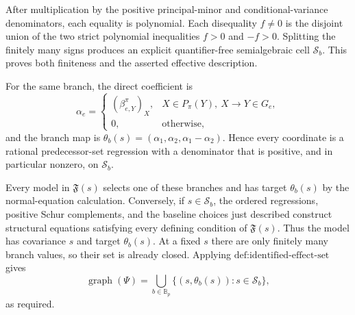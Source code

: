 After multiplication by the positive principal-minor and conditional-variance denominators, each equality is polynomial.  Each disequality \(f\ne0\) is the disjoint union of the two strict polynomial inequalities \(f>0\) and \(-f>0\).  Splitting the finitely many signs produces an explicit quantifier-free semialgebraic cell \(\mathcal S_b\).  This proves both finiteness and the asserted effective description.

For the same branch, the direct coefficient is
\[
 \alpha_e=
 \begin{cases}
  (\beta_{e,Y}^{\pi})_X,&X\in P_\pi(Y),\ X\to Y\in G_e,\\
  0,&\text{otherwise},
 \end{cases}
\]
and the branch map is \(\theta_b(s)=(\alpha_1,\alpha_2,\alpha_1-\alpha_2)\).  Hence every coordinate is a rational predecessor-set regression with a denominator that is positive, and in particular nonzero, on \(\mathcal S_b\).

Every model in \(\mathfrak F(s)\) selects one of these branches and has target \(\theta_b(s)\) by the normal-equation calculation.  Conversely, if \(s\in\mathcal S_b\), the ordered regressions, positive Schur complements, and the baseline choices just described construct structural equations satisfying every defining condition of \(\mathfrak F(s)\).  Thus the model has covariance \(s\) and target \(\theta_b(s)\).  At a fixed \(s\) there are only finitely many branch values, so their set is already closed.  Applying \(\text{def:identified-effect-set}\) gives
\[
 \operatorname{graph}(\Psi)
 =\bigcup_{b\in\mathbb B_p}
   \{(s,\theta_b(s)):s\in\mathcal S_b\},
\]
as required.